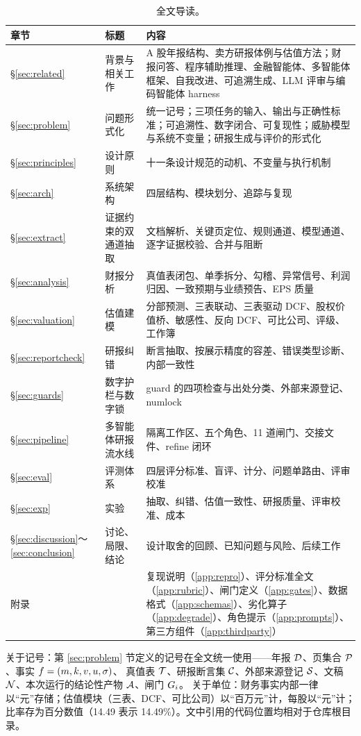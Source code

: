 \begin{table}[h]
\centering
\caption{全文导读。}
\label{tab:intro-roadmap}
\small
\begin{tabularx}{\linewidth}{@{}p{1.3cm}p{3.2cm}X@{}}
\toprule
章节 & 标题 & 内容 \\
\midrule
\S\ref{sec:related} & 背景与相关工作 & A 股年报结构、卖方研报体例与估值方法；财报问答、程序辅助推理、金融智能体、多智能体框架、自我改进、可追溯生成、LLM 评审与编码智能体 harness \\
\S\ref{sec:problem} & 问题形式化 & 统一记号；三项任务的输入、输出与正确性标准；可追溯性、数字闭合、可复现性；威胁模型与系统不变量；研报生成与评价的形式化 \\
\S\ref{sec:principles} & 设计原则 & 十一条设计规范的动机、不变量与执行机制 \\
\S\ref{sec:arch} & 系统架构 & 四层结构、模块划分、追踪与复现 \\
\S\ref{sec:extract} & 证据约束的双通道抽取 & 文档解析、关键页定位、规则通道、模型通道、逐字证据校验、合并与阻断 \\
\S\ref{sec:analysis} & 财报分析 & 真值表闭包、单季拆分、勾稽、异常信号、利润归因、一致预期与业绩预告、EPS 质量 \\
\S\ref{sec:valuation} & 估值建模 & 分部预测、三表联动、三表驱动 DCF、股权价值桥、敏感性、反向 DCF、可比公司、评级、工作簿 \\
\S\ref{sec:reportcheck} & 研报纠错 & 断言抽取、按展示精度的容差、错误类型诊断、内部一致性 \\
\S\ref{sec:guards} & 数字护栏与数字锁 & guard 的四项检查与出处分类、外部来源登记、numlock \\
\S\ref{sec:pipeline} & 多智能体研报流水线 & 隔离工作区、五个角色、11 道闸门、交接文件、refine 闭环 \\
\S\ref{sec:eval} & 评测体系 & 四层评分标准、盲评、计分、问题单路由、评审校准 \\
\S\ref{sec:exp} & 实验 & 抽取、纠错、估值一致性、研报质量、评审校准、成本 \\
\S\ref{sec:discussion}～\ref{sec:conclusion} & 讨论、局限、结论 & 设计取舍的回顾、已知问题与风险、后续工作 \\
附录 & & 复现说明（\ref{app:repro}）、评分标准全文（\ref{app:rubric}）、闸门定义（\ref{app:gates}）、数据格式（\ref{app:schemas}）、劣化算子（\ref{app:degrade}）、角色提示（\ref{app:prompts}）、第三方组件（\ref{app:thirdparty}） \\
\bottomrule
\end{tabularx}
\end{table}

关于记号：第 \ref{sec:problem} 节定义的记号在全文统一使用——年报 $\mathcal{D}$、页集合 $\mathcal{P}$、事实 $f=(m,k,v,u,\sigma)$、
真值表 $\mathcal{T}$、研报断言集 $\mathcal{C}$、外部来源登记 $\mathcal{S}$、文稿 $\mathcal{N}$、本次运行的结论性产物 $\mathcal{A}$、闸门 $G_i$。
关于单位：财务事实内部一律以“元”存储；估值模块（三表、DCF、可比公司）以“百万元”计，每股以“元”计；
比率存为百分数值（14.49 表示 14.49\%）。文中引用的代码位置均相对于仓库根目录。
